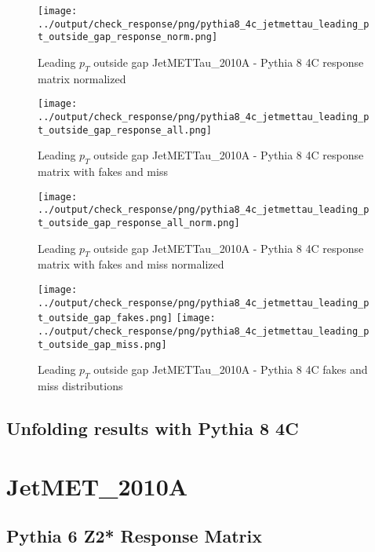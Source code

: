 \documentclass[11pt]{book}
\begin{document}
\begin{figure}[ht]
\centering
\texttt{[image: ../output/check\_response/png/pythia8\_4c\_jetmettau\_leading\_pt\_outside\_gap\_response\_norm.png]}
\caption{Leading $p_{T}$ outside gap JetMETTau\_2010A - Pythia 8 4C response matrix normalized}
\label{p8_jetmettau_leading_pt_outside_gap_response_norm}
\end{figure}

\begin{figure}[ht]
\centering
\texttt{[image: ../output/check\_response/png/pythia8\_4c\_jetmettau\_leading\_pt\_outside\_gap\_response\_all.png]}
\caption{Leading $p_{T}$ outside gap JetMETTau\_2010A - Pythia 8 4C response matrix with fakes and miss}
\label{p8_jetmettau_leading_pt_outside_gap_response_all}
\end{figure}

\begin{figure}[ht]
\centering
\texttt{[image: ../output/check\_response/png/pythia8\_4c\_jetmettau\_leading\_pt\_outside\_gap\_response\_all\_norm.png]}
\caption{Leading $p_{T}$ outside gap JetMETTau\_2010A - Pythia 8 4C response matrix with fakes and miss normalized}
\label{p8_jetmettau_leading_pt_outside_gap_response_all_norm}
\end{figure}

\begin{figure}[ht]
\centering
\texttt{[image: ../output/check\_response/png/pythia8\_4c\_jetmettau\_leading\_pt\_outside\_gap\_fakes.png]}
\texttt{[image: ../output/check\_response/png/pythia8\_4c\_jetmettau\_leading\_pt\_outside\_gap\_miss.png]}
\caption{Leading $p_{T}$ outside gap JetMETTau\_2010A - Pythia 8 4C fakes and miss distributions}
\label{p8_jetmettau_leading_pt_outside_gap_fakesmiss}
\end{figure}


\clearpage
\subsection{Unfolding results with Pythia 8 4C}


\section{JetMET\_2010A}
\subsection{Pythia 6 Z2* Response Matrix}
\end{document}
